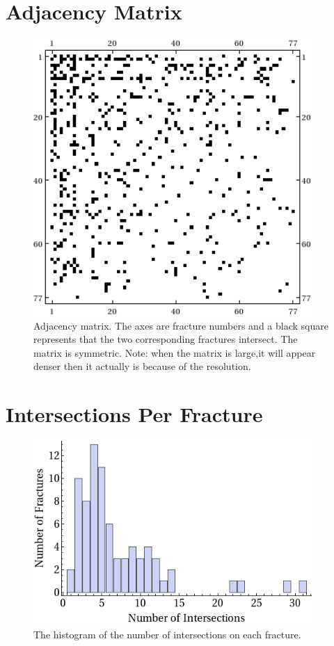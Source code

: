 \documentclass[a4paper,11pt]{article}
\begin{document}
\section{Adjacency Matrix}
\begin{figure}[H]
  \centering
 \includegraphics[width=300pt]{adj.png}
 \caption[Adjacency matrix]{Adjacency matrix. The axes are fracture numbers and a black square represents that the two corresponding fractures intersect. The matrix is symmetric. Note: when the matrix is large,it will appear denser then it actually is because of the resolution. }
\end{figure}

\section{Intersections Per Fracture}
\begin{figure}[H]
   \centering
    \includegraphics[width=300pt]{graphIntersectionNumber.png}
 \caption[Intersections Per Fracture]{The histogram of the number of intersections on each fracture.}
\end{figure}
\end{document}
